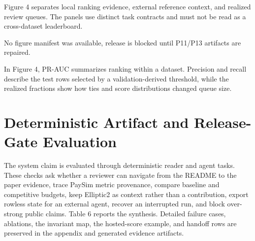 \documentclass[11pt]{article}
\begin{document}
Figure 4 separates local ranking evidence, external reference context, and realized review queues. The panels use distinct task contracts and must not be read as a cross-dataset leaderboard.

No figure manifest was available, release is blocked until P11/P13 artifacts are repaired.

In Figure 4, PR-AUC summarizes ranking within a dataset. Precision and recall describe the test rows selected by a validation-derived threshold, while the realized fractions show how ties and score distributions changed queue size.

\section{Deterministic Artifact and Release-Gate Evaluation}

The system claim is evaluated through deterministic reader and agent tasks. These checks ask whether a reviewer can navigate from the README to the paper evidence, trace PaySim metric provenance, compare baseline and competitive budgets, keep Elliptic2 as context rather than a contribution, export rowless state for an external agent, recover an interrupted run, and block over-strong public claims. Table 6 reports the synthesis. Detailed failure cases, ablations, the invariant map, the hosted-score example, and handoff rows are preserved in the appendix and generated evidence artifacts.
\end{document}
